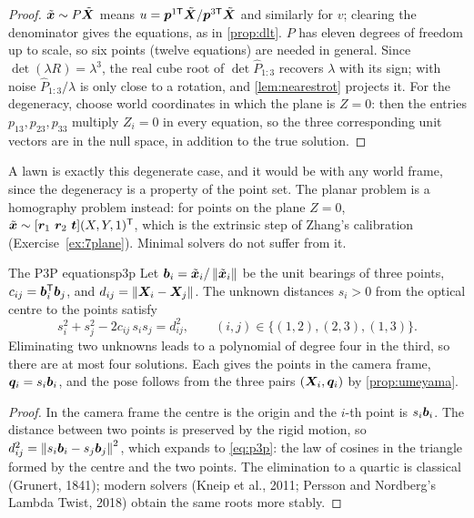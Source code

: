 \begin{proof}
$\tilde{\bm{x}}\sim P\tilde{\bm{X}}$ means $u=\bm{p}^{1\mathsf T}
\tilde{\bm{X}}/\bm{p}^{3\mathsf T}\tilde{\bm{X}}$ and similarly for
$v$; clearing the denominator gives the equations, as in
\cref{prop:dlt}. $P$ has eleven degrees of freedom up to scale, so six
points (twelve equations) are needed in general. Since $\det(\lambda R)=
\lambda^3$, the real cube root of $\det\hat P_{1:3}$ recovers $\lambda$
with its sign; with noise $\hat P_{1:3}/\lambda$ is only close to a
rotation, and \cref{lem:nearestrot} projects it. For the degeneracy,
choose world coordinates in which the plane is $Z=0$: then the entries
$p_{13},p_{23},p_{33}$ multiply $Z_i=0$ in every equation, so the three
corresponding unit vectors are in the null space, in addition to the
true solution.
\end{proof}

A lawn is exactly this degenerate case, and it would be with any world
frame, since the degeneracy is a property of the point set. The planar
problem is a homography problem instead: for points on the plane $Z=0$,
$\tilde{\vect{x}}\sim[\vect{r}_1\ \vect{r}_2\ \vect{t}](X,Y,1)\T$, which
is the extrinsic step of Zhang's calibration (Exercise~\ref{ex:7plane}).
Minimal solvers do not suffer from it.

\begin{proposition}{The P3P equations}{p3p}
Let $\bm{b}_i=\tilde{\bm{x}}_i/\left\lVert \tilde{\bm{x}}_i\right\rVert$ be the unit
bearings of three points, $c_{ij}=\bm{b}_i^{\mathsf{T}}\bm{b}_j$, and
$d_{ij}=\left\lVert \bm{X}_i-\bm{X}_j\right\rVert$. The unknown distances
$s_i>0$ from the optical centre to the points satisfy
\begin{equation}\label{eq:p3p}
s_i^2+s_j^2-2c_{ij}\,s_is_j=d_{ij}^2,\qquad (i,j)\in\{(1,2),(2,3),
(1,3)\}.
\end{equation}
Eliminating two unknowns leads to a polynomial of degree four in the
third, so there are at most four solutions. Each gives the points in
the camera frame, $\bm{q}_i=s_i\bm{b}_i$, and the pose follows from
the three pairs $(\bm{X}_i,\bm{q}_i)$ by \cref{prop:umeyama}.
\end{proposition}

\begin{proof}
In the camera frame the centre is the origin and the $i$-th point is
$s_i\bm{b}_i$. The distance between two points is preserved by the
rigid motion, so $d_{ij}^2=\left\lVert s_i\bm{b}_i-s_j\bm{b}_j\right\rVert^2$, which
expands to \eqref{eq:p3p}: the law of cosines in the triangle formed by
the centre and the two points. The elimination to a quartic is classical
(Grunert, 1841); modern solvers (Kneip et al., 2011; Persson and
Nordberg's Lambda Twist, 2018) obtain the same roots more stably.
\end{proof}

